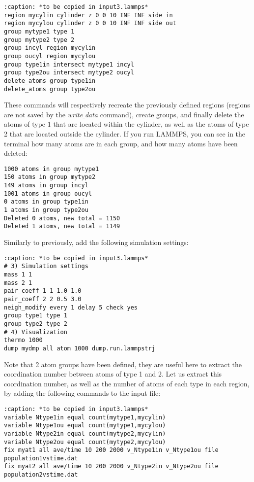 \begin{verbatim}
:caption: *to be copied in input3.lammps*
region mycylin cylinder z 0 0 10 INF INF side in
region mycylou cylinder z 0 0 10 INF INF side out
group mytype1 type 1
group mytype2 type 2
group incyl region mycylin
group oucyl region mycylou
group type1in intersect mytype1 incyl
group type2ou intersect mytype2 oucyl
delete_atoms group type1in
delete_atoms group type2ou
\end{verbatim}

\noindent These commands will respectively recreate
the previously defined regions (regions are not saved by the
\textit{write$\_$data} command), create groups, and finally delete the
atoms of type 1 that are located within the cylinder, as
well as the atoms of type 2 that are located outside the
cylinder. If you run LAMMPS, you can see in the terminal how
many atoms are in each group, and how many atoms have been
deleted:

\begin{verbatim}
1000 atoms in group mytype1
150 atoms in group mytype2
149 atoms in group incyl
1001 atoms in group oucyl
0 atoms in group type1in
1 atoms in group type2ou
Deleted 0 atoms, new total = 1150
Deleted 1 atoms, new total = 1149
\end{verbatim}

\noindent Similarly to previously, add the following simulation
settings:

\begin{verbatim}
:caption: *to be copied in input3.lammps*
# 3) Simulation settings
mass 1 1
mass 2 1
pair_coeff 1 1 1.0 1.0
pair_coeff 2 2 0.5 3.0
neigh_modify every 1 delay 5 check yes
group type1 type 1
group type2 type 2
# 4) Visualization
thermo 1000
dump mydmp all atom 1000 dump.run.lammpstrj
\end{verbatim}

\noindent Note that 2 atom groups have been defined, they are useful
here to extract the coordination number between atoms of
type 1 and 2. Let us extract this coordination number, as
well as the number of atoms of each type in each region, by
adding the following commands to the input file:

\begin{verbatim}
:caption: *to be copied in input3.lammps*
variable Ntype1in equal count(mytype1,mycylin)
variable Ntype1ou equal count(mytype1,mycylou)
variable Ntype2in equal count(mytype2,mycylin)
variable Ntype2ou equal count(mytype2,mycylou)
fix myat1 all ave/time 10 200 2000 v_Ntype1in v_Ntype1ou file population1vstime.dat
fix myat2 all ave/time 10 200 2000 v_Ntype2in v_Ntype2ou file population2vstime.dat
\end{verbatim}

